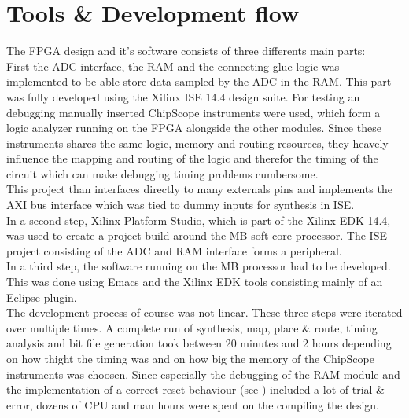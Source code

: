 \section{Tools \& Development flow}
\label{sec:fpga_tools}

The \gls{FPGA} design and it's software consists of three differents
main parts: \\

First the \gls{ADC} interface, the \gls{RAM} and the connecting
glue logic was implemented to be able store data sampled by the \gls{ADC}
in the \gls{RAM}. This part was fully developed using the Xilinx ISE 14.4
design suite. For testing an debugging manually inserted ChipScope
instruments were used, which form a logic analyzer running on the \gls{FPGA}
alongside the other modules. Since these instruments shares the same logic,
memory and routing resources, they heavely influence the mapping and routing
of the logic and therefor the timing of the circuit which can make debugging
timing problems cumbersome. \\
This project than interfaces directly to many externals pins and implements
the \gls{AXI} bus interface which was tied to dummy inputs for synthesis in ISE.
\\

In a second step, Xilinx Platform Studio, which is part of the Xilinx
\gls{EDK} 14.4, was used to create a project build around the \acrfull{MB}
soft-core processor. The ISE project consisting of the \gls{ADC} and \gls{RAM}
interface forms a peripheral. \\

In a third step, the software running on the \gls{MB} processor had to be
developed. This was done using Emacs and the Xilinx \gls{EDK} tools
consisting mainly of an Eclipse plugin. \\

The development process of course was not linear. These three steps were
iterated over multiple times. A complete run of synthesis, map,
place \& route, timing analysis and bit file generation
took between 20 minutes and 2 hours depending on how thight the timing was
and on how big the memory of the ChipScope instruments was choosen.
Since especially the debugging of the \gls{RAM} module and the implementation of
a correct reset behaviour (see ) included a lot of
trial \& error, dozens of \acrshort{CPU} and man hours were spent on the
compiling the design.
